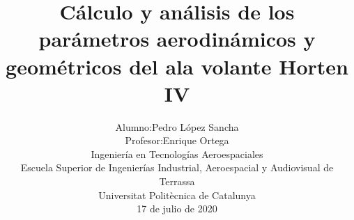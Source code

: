 
\title{\LARGE{Cálculo y análisis de los parámetros aerodinámicos y geométricos del ala volante Horten IV}}
\author{
\begin{tabular}{rl}
     Alumno:    & Pedro López Sancha \\
     Profesor:  & Enrique Ortega 
\end{tabular}

\begin{tabular}{c}
    Ingeniería en Tecnologías Aeroespaciales \\
    Escuela Superior de Ingenierías Industrial, Aeroespacial y Audiovisual de Terrassa \\
    Universitat Politècnica de Catalunya \\
\end{tabular}

17 de julio de 2020
}

